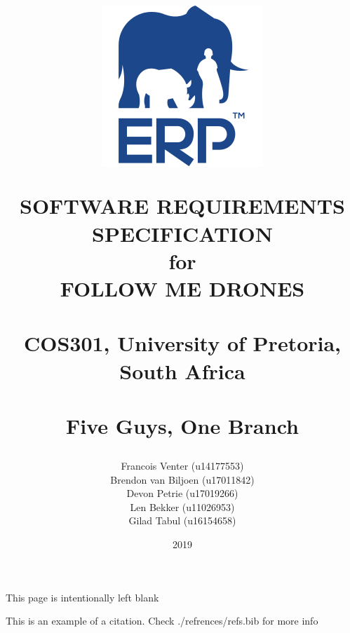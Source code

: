 \documentclass[a4paper,11pt]{book}
\title{
	\begin{figure}[h!]
		\centering
		\includegraphics[scale=0.5]{./assets/images/erp-logo.png}
		\label{fig: erp-logo}
		\caption{}
	\end{figure}
	\vspace{0.5cm}
	\begin{center}
		\Huge{SOFTWARE REQUIREMENTS\\ SPECIFICATION}\\
		for\\
		FOLLOW ME DRONES\\
		~\\
		\LARGE{COS301, University of Pretoria, South Africa}\\
		~\\
		Five Guys, One Branch
	\end{center}
}
\author{
	Francois Venter (u14177553)\\ 
	Brendon van Biljoen (u17011842)\\ 
	Devon Petrie (u17019266)\\ 
	Len Bekker (u11026953)\\ 
	Gilad Tabul (u16154658)\\
}
\date{2019}
\begin{document}
\frontmatter
\maketitle

\begin{center}
	This page is intentionally left blank
\end{center}
\let\cleardoublepage\clearpage
\tableofcontents



\mainmatter

%


% 


% 


This is an example of a citation. \cite{DUMMY:1} Check ./refrences/refs.bib for more info 


\end{document}
